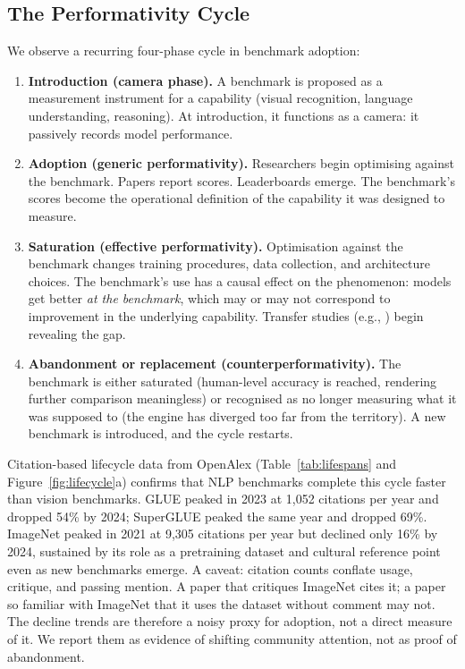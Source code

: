 \documentclass{article}
\begin{document}
\subsection{The Performativity Cycle}

We observe a recurring four-phase cycle in benchmark adoption:

\begin{enumerate}[leftmargin=*]
  \item \textbf{Introduction (camera phase).} A benchmark is proposed as a measurement instrument for a capability (visual recognition, language understanding, reasoning). At introduction, it functions as a camera: it passively records model performance.
  \item \textbf{Adoption (generic performativity).} Researchers begin optimising against the benchmark. Papers report scores. Leaderboards emerge. The benchmark's scores become the operational definition of the capability it was designed to measure.
  \item \textbf{Saturation (effective performativity).} Optimisation against the benchmark changes training procedures, data collection, and architecture choices. The benchmark's use has a causal effect on the phenomenon: models get better \textit{at the benchmark}, which may or may not correspond to improvement in the underlying capability. Transfer studies (e.g., \citealt{recht_imagenet_2019}) begin revealing the gap.
  \item \textbf{Abandonment or replacement (counterperformativity).} The benchmark is either saturated (human-level accuracy is reached, rendering further comparison meaningless) or recognised as no longer measuring what it was supposed to (the engine has diverged too far from the territory). A new benchmark is introduced, and the cycle restarts.
\end{enumerate}

Citation-based lifecycle data from OpenAlex (Table~\ref{tab:lifespans} and Figure~\ref{fig:lifecycle}a) confirms that NLP benchmarks complete this cycle faster than vision benchmarks. GLUE peaked in 2023 at 1,052 citations per year and dropped 54\% by 2024; SuperGLUE peaked the same year and dropped 69\%. ImageNet peaked in 2021 at 9,305 citations per year but declined only 16\% by 2024, sustained by its role as a pretraining dataset and cultural reference point even as new benchmarks emerge. A caveat: citation counts conflate usage, critique, and passing mention. A paper that critiques ImageNet cites it; a paper so familiar with ImageNet that it uses the dataset without comment may not. The decline trends are therefore a noisy proxy for adoption, not a direct measure of it. We report them as evidence of shifting community attention, not as proof of abandonment.
\end{document}
